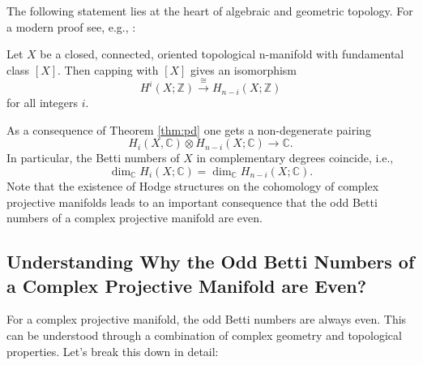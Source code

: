 \documentclass[lang=en,12pt,twoside]{textbook}
\begin{document}
The following statement lies at the heart of algebraic and geometric topology. For a modern proof see, e.g.,  \cite[Section 3.3]{hatcher2002algebraic}:
\begin{theorem}\label{thm:pd}
    Let $X$ be a closed, connected, oriented topological n-manifold with fundamental class $[X]$. Then capping with $[X]$ gives an isomorphism
$$
H^i(X ; \mathbb{Z}) \xrightarrow{\cong} H_{n-i}(X ; \mathbb{Z})
$$
for all integers $i$.
\end{theorem}
    As a consequence of Theorem \ref{thm:pd} one gets a non-degenerate pairing
$$
H_i(X, \mathbb{C}) \otimes H_{n-i}(X ; \mathbb{C}) \longrightarrow \mathbb{C}.
$$
In particular, the Betti numbers of $X$ in complementary degrees coincide, i.e.,
$$
\operatorname{dim}_{\mathbb{C}} H_i(X ; \mathbb{C})=\operatorname{dim}_{\mathbb{C}} H_{n-i}(X ; \mathbb{C}).
$$
Note that the existence of Hodge structures on the cohomology of complex projective manifolds leads to an important consequence that the odd Betti numbers of a complex projective manifold are even. 


\subsection{Understanding Why the Odd Betti Numbers of a Complex Projective Manifold are Even?}

For a complex projective manifold, the odd Betti numbers are always even. This can be understood through a combination of complex geometry and topological properties. Let’s break this down in detail:
\end{document}
